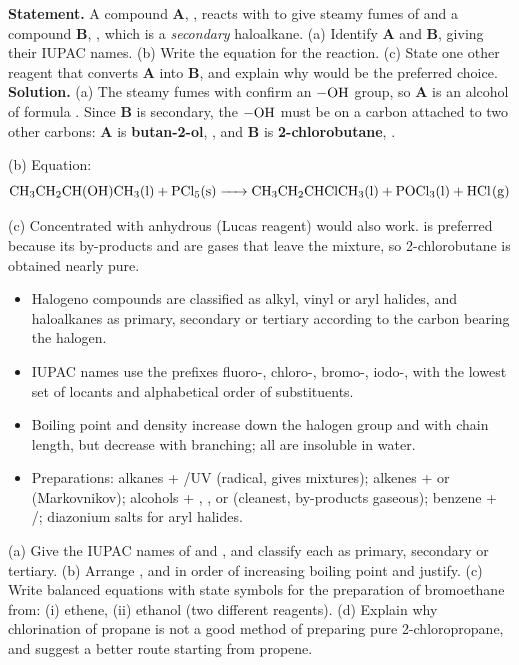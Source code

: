 \documentclass[11pt]{article}
\begin{document}
\begin{exoresolu}
\textbf{Statement.} A compound \textbf{A}, , reacts with  to give steamy fumes of  and a compound \textbf{B}, , which is a \emph{secondary} haloalkane. (a) Identify \textbf{A} and \textbf{B}, giving their IUPAC names. (b) Write the equation for the reaction. (c) State one other reagent that converts \textbf{A} into \textbf{B}, and explain why  would be the preferred choice.
\tcblower
\textbf{Solution.} (a) The steamy fumes with  confirm an $-\ce{OH}$ group, so \textbf{A} is an alcohol of formula . Since \textbf{B} is secondary, the $-\ce{OH}$ must be on a carbon attached to two other carbons: \textbf{A} is \textbf{butan-2-ol}, , and \textbf{B} is \textbf{2-chlorobutane}, .

(b) Equation:
\[ \ce{CH3CH2CH(OH)CH3(l) + PCl5(s) -> CH3CH2CHClCH3(l) + POCl3(l) + HCl(g)} \]

(c) Concentrated  with anhydrous  (Lucas reagent) would also work.  is preferred because its by-products  and  are gases that leave the mixture, so 2-chlorobutane is obtained nearly pure.
\end{exoresolu}

\begin{aretenir}
\begin{itemize}
\item Halogeno compounds  are classified as alkyl, vinyl or aryl halides, and haloalkanes as primary, secondary or tertiary according to the carbon bearing the halogen.
\item IUPAC names use the prefixes fluoro-, chloro-, bromo-, iodo-, with the lowest set of locants and alphabetical order of substituents.
\item Boiling point and density increase down the halogen group and with chain length, but decrease with branching; all are insoluble in water.
\item Preparations: alkanes + /UV (radical, gives mixtures); alkenes +  or  (Markovnikov); alcohols + , ,  or  (cleanest, by-products gaseous); benzene + /; diazonium salts for aryl halides.
\end{itemize}
\end{aretenir}

\begin{exercice}[Practice]
(a) Give the IUPAC names of  and , and classify each as primary, secondary or tertiary.
(b) Arrange ,  and  in order of increasing boiling point and justify.
(c) Write balanced equations with state symbols for the preparation of bromoethane from: (i) ethene, (ii) ethanol (two different reagents).
(d) Explain why chlorination of propane is not a good method of preparing pure 2-chloropropane, and suggest a better route starting from propene.
\end{exercice}
\end{document}
